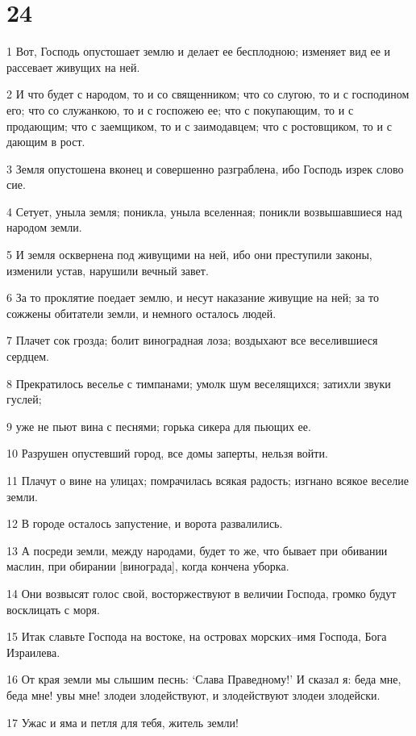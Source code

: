 \chapter{24}

\par 1 Вот, Господь опустошает землю и делает ее бесплодною; изменяет вид ее и рассевает живущих на ней.
\par 2 И что будет с народом, то и со священником; что со слугою, то и с господином его; что со служанкою, то и с госпожею ее; что с покупающим, то и с продающим; что с заемщиком, то и с заимодавцем; что с ростовщиком, то и с дающим в рост.
\par 3 Земля опустошена вконец и совершенно разграблена, ибо Господь изрек слово сие.
\par 4 Сетует, уныла земля; поникла, уныла вселенная; поникли возвышавшиеся над народом земли.
\par 5 И земля осквернена под живущими на ней, ибо они преступили законы, изменили устав, нарушили вечный завет.
\par 6 За то проклятие поедает землю, и несут наказание живущие на ней; за то сожжены обитатели земли, и немного осталось людей.
\par 7 Плачет сок грозда; болит виноградная лоза; воздыхают все веселившиеся сердцем.
\par 8 Прекратилось веселье с тимпанами; умолк шум веселящихся; затихли звуки гуслей;
\par 9 уже не пьют вина с песнями; горька сикера для пьющих ее.
\par 10 Разрушен опустевший город, все домы заперты, нельзя войти.
\par 11 Плачут о вине на улицах; помрачилась всякая радость; изгнано всякое веселие земли.
\par 12 В городе осталось запустение, и ворота развалились.
\par 13 А посреди земли, между народами, будет то же, что бывает при обивании маслин, при обирании [винограда], когда кончена уборка.
\par 14 Они возвысят голос свой, восторжествуют в величии Господа, громко будут восклицать с моря.
\par 15 Итак славьте Господа на востоке, на островах морских--имя Господа, Бога Израилева.
\par 16 От края земли мы слышим песнь: `Слава Праведному!' И сказал я: беда мне, беда мне! увы мне! злодеи злодействуют, и злодействуют злодеи злодейски.
\par 17 Ужас и яма и петля для тебя, житель земли!
